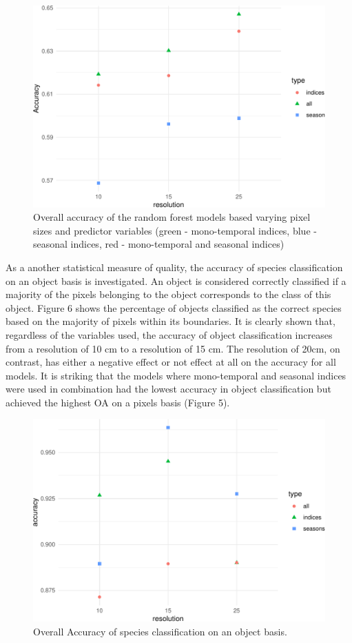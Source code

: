 \documentclass[]{article}
\begin{document}
\begin{figure}[H]

{\centering \includegraphics[width=0.6\linewidth]{report_files/figure-latex/result_plots-1} 

}

\caption{Overall accuracy of the random forest models based varying pixel sizes and predictor variables (green - mono-temporal indices, blue - seasonal indices, red - mono-temporal and seasonal indices)}\label{fig:result_plots}
\end{figure}

As a another statistical measure of quality, the accuracy of species
classification on an object basis is investigated. An object is
considered correctly classified if a majority of the pixels belonging to
the object corresponds to the class of this object. Figure 6 shows the
percentage of objects classified as the correct species based on the
majority of pixels within its boundaries. It is clearly shown that,
regardless of the variables used, the accuracy of object classification
increases from a resolution of 10 cm to a resolution of 15 cm. The
resolution of 20cm, on contrast, has either a negative effect or not
effect at all on the accuracy for all models. It is striking that the
models where mono-temporal and seasonal indices were used in combination
had the lowest accuracy in object classification but achieved the
highest OA on a pixels basis (Figure 5).

\begin{figure}[H]

{\centering \includegraphics[width=0.6\linewidth]{report_files/figure-latex/validation_plots-1} 

}

\caption{Overall Accuracy of species classification on an object basis.}\label{fig:validation_plots}
\end{figure}
\end{document}
